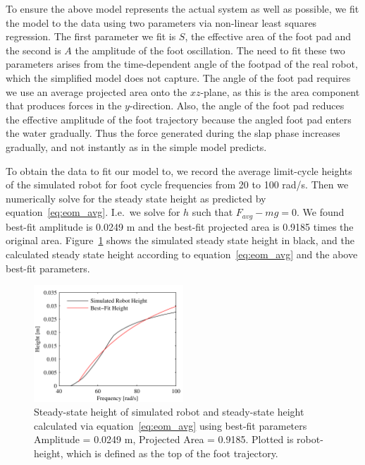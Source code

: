 To ensure the above model represents the actual system as well as possible, we fit the model to the data using two parameters via non-linear least squares regression. The first parameter we fit is $S$, the effective area of the foot pad and the second is $A$ the amplitude of the foot oscillation. The need to fit these two parameters arises from the time-dependent angle of the footpad of the real robot, which the simplified model does not capture. The angle of the foot pad requires we use an average projected area onto the $xz$-plane, as this is the area component that produces forces in the $y$-direction. Also, the angle of the foot pad reduces the effective amplitude of the foot trajectory because the angled foot pad enters the water gradually. Thus the force generated during the slap phase increases gradually, and not instantly as in the simple model predicts.

To obtain the data to fit our model to, we record the average limit-cycle heights of the simulated robot for foot cycle frequencies from 20 to 100 rad/s. Then we numerically solve for the steady state height as predicted by equation~\ref{eq:eom_avg}. I.e.\ we solve for $h$ such that $F_{avg} - mg = 0$. We found best-fit amplitude is 0.0249 m and the best-fit projected area is 0.9185 times the original area. Figure~\ref{fig:fitheight} shows the simulated steady state height in black, and the calculated steady state height according to equation~\ref{eq:eom_avg} and the above best-fit parameters.

\begin{figure}[htb]
	\centering
	\includegraphics[width = 0.5\textwidth]{figures/fitheight.pdf}
	\caption{Steady-state height of simulated robot and steady-state height calculated via equation~\ref{eq:eom_avg} using best-fit parameters Amplitude = 0.0249 m, Projected Area = 0.9185. Plotted is robot-height, which is defined as the top of the foot trajectory.}
	\label{fig:fitheight}
\end{figure}
